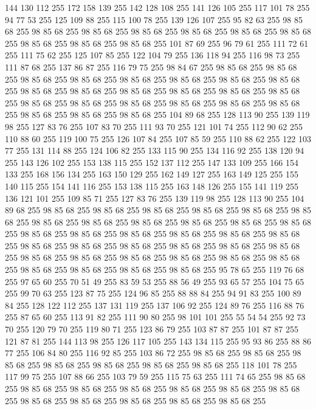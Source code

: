 144 130 112 255 172 158 139 255 142 128 108 255 141 126 105 255 117 101 78 255 94 77 53 255 125 109 88 255 115 100 78 255 139 126 107 255 95 82 63 255 98 85 68 255 98 85 68 255 98 85 68 255 98 85 68 255 98 85 68 255 98 85 68 255 98 85 68 255 98 85 68 255 98 85 68 255 98 85 68 255 101 87 69 255 96 79 61 255 111 72 61 255 111 75 62 255 125 107 85 255 122 104 79 255 136 118 94 255 116 98 73 255 111 87 68 255 137 86 87 255 116 79 75 255 98 84 67 255 98 85 68 255 98 85 68 255 98 85 68 255 98 85 68 255 98 85 68 255 98 85 68 255 98 85 68 255 98 85 68 255 98 85 68 255 98 85 68 255 98 85 68 255 98 85 68 255 98 85 68 255 98 85 68 255 98 85 68 255 98 85 68 255 98 85 68 255 98 85 68 255 98 85 68 255 98 85 68 255 98 85 68 255 98 85 68 255 98 85 68 255 104 89 68 255 128 113 90 255 139 119 98 255 127 83 76 255 107 83 70 255 111 93 70 255 121 101 74 255 112 90 62 255 110 88 60 255
119 100 75 255 126 107 84 255 107 85 59 255 110 88 62 255 122 103 77 255 131 114 88 255 124 106 82 255 133 115 90 255 134 116 92 255 138 120 94 255 143 126 102 255 153 138 115 255 152 137 112 255 147 133 109 255 166 154 133 255 168 156 134 255 163 150 129 255 162 149 127 255 163 149 125 255 155 140 115 255 154 141 116 255 153 138 115 255 163 148 126 255 155 141 119 255 136 121 101 255 109 85 71 255 127 83 76 255 139 119 98 255 128 113 90 255 104 89 68 255 98 85 68 255 98 85 68 255 98 85 68 255 98 85 68 255 98 85 68 255 98 85 68 255 98 85 68 255 98 85 68 255 98 85 68 255 98 85 68 255 98 85 68 255 98 85 68 255 98 85 68 255 98 85 68 255 98 85 68 255 98 85 68 255 98 85 68 255 98 85 68 255 98 85 68 255 98 85 68 255 98 85 68 255 98 85 68 255 98 85 68 255 98 85 68 255 98 85 68 255 98 85 68 255 98 85 68 255 98 85 68 255 98 85 68 255 98 85 68 255 98 85 68 255 98 85 68 255 98 85 68 255 98 85 68 255
95 78 65 255 119 76 68 255 97 65 60 255 70 51 49 255 83 59 53 255 88 56 49 255 93 65 57 255 104 75 65 255 99 70 63 255 123 87 75 255 124 96 85 255 88 88 84 255 94 91 83 255 100 89 84 255 128 122 112 255 137 131 119 255 137 106 92 255 124 89 76 255 116 88 76 255 87 65 60 255 113 91 82 255 111 90 80 255 98 101 101 255 55 54 54 255 92 73 70 255 120 79 70 255 119 80 71 255 123 86 79 255 103 87 87 255 101 87 87 255 121 87 81 255 144 113 98 255 126 117 105 255 143 134 115 255 95 93 86 255 88 86 77 255 106 84 80 255 116 92 85 255 103 86 72 255 98 85 68 255 98 85 68 255 98 85 68 255 98 85 68 255 98 85 68 255 98 85 68 255 98 85 68 255 118 101 78 255 117 99 75 255 107 88 66 255 103 79 59 255 115 75 63 255 111 74 65 255 98 85 68 255 98 85 68 255 98 85 68 255 98 85 68 255 98 85 68 255 98 85 68 255 98 85 68 255 98 85 68 255 98 85 68 255 98 85 68 255 98 85 68 255 98 85 68 255
